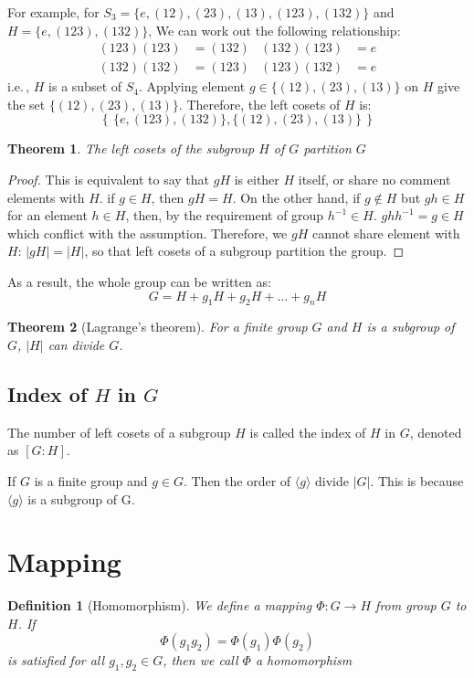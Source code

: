 \documentclass{amsart}
\newtheorem{definition}{Definition}
\newtheorem{theorem}{Theorem}
\begin{document}
For example, for $S_3 = \{e, (12), (23), (13), (123), (132)\}$ 
and $H = \{e,(123),(132)\}$, We can work out the following relationship:
\begin{align*}
    (123)(123) &= (132) &  (132)(123) &= e \\
    (132)(132) &= (123) &  (123)(132) &= e 
\end{align*}
i.e.\,, $H$ is a subset of $S_4$. Applying element $g \in \{(12), (23), (13)\}$ on $H$
give the set $\{(12), (23), (13)\}$. Therefore, the left cosets of $H$ is:
\[
    \left\{\, \{e,(123),(132)\}, \{(12), (23), (13)\}\, \right\}    
\]

\vspace{10pt}

\begin{theorem}
    The left cosets of the subgroup $H$ of $G$ partition $G$
\end{theorem}
\begin{proof}
    This is equivalent to say that $gH$ is either $H$ itself, or share no comment elements with $H$.
    if $g\in H$, then $gH = H$. On the other hand, 
    if $g\notin H$ but $gh \in H$ for an element $h\in H$, then, by the requirement of group $h^{-1}\in H$. $ghh^{-1} = g \in H$ which conflict with the assumption.
    Therefore, we $gH$ cannot share element with $H$: $|gH| = |H|$, so that left cosets of a subgroup partition the group.
\end{proof}
As a result, the whole group can be written as:
\[
    G = H + g_1 H + g_2 H + \dots + g_n H    
\]
\begin{theorem}[Lagrange's theorem]
    For a finite group $G$ and $H$ is a subgroup of $G$, $|H|$ can divide $G$.
\end{theorem}
\subsection*{Index of $H$ in $G$}
    The number of left cosets of a subgroup $H$ is called the index of $H$ in $G$, denoted as $[G:H]$.

If $G$ is a finite group and $g\in G$. Then the order of $\langle g\rangle$ divide $|G|$. This is because 
$\langle g\rangle$ is a subgroup of G.

\section{Mapping}

\begin{definition}[Homomorphism]
    We define a mapping $\Phi\colon G \to H$ from group $G$ to $H$. If
    \[
        \Phi(g_1 g_2) = \Phi(g_1) \Phi(g_2)    
    \] 
    is satisfied for all $g_1, g_2 \in G$, then we call $\Phi$ a homomorphism
\end{definition}
\end{document}
